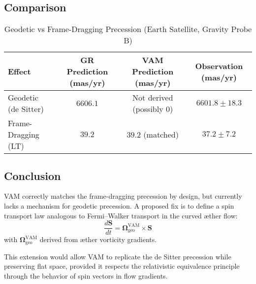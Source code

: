 \subsection*{Comparison}

\begin{table}[h!]
    \centering
    \caption{Geodetic vs Frame-Dragging Precession (Earth Satellite, Gravity Probe B)}
    \label{tab:geodetic}
    \begin{tabular}{lccc}
        \toprule
        Effect & GR Prediction (mas/yr) & VAM Prediction (mas/yr) & Observation (mas/yr) \\
        \midrule
        Geodetic (de Sitter) & $6606.1$ & Not derived (possibly $0$) & $6601.8 \pm 18.3$ \\
        Frame-Dragging (LT)  & $39.2$   & $39.2$ (matched)           & $37.2 \pm 7.2$ \\
        \bottomrule
    \end{tabular}
\end{table}

\subsection*{Conclusion}

VAM correctly matches the frame-dragging precession by design, but currently lacks a mechanism for geodetic precession. A proposed fix is to define a spin transport law analogous to Fermi--Walker transport in the curved æther flow:
\begin{equation}
    \frac{d\mathbf{S}}{dt} = \boldsymbol{\Omega}_\text{geo}^\text{VAM} \times \mathbf{S}
\end{equation}
with $\boldsymbol{\Omega}_\text{geo}^\text{VAM}$ derived from æther vorticity gradients.

This extension would allow VAM to replicate the de Sitter precession while preserving flat space, provided it respects the relativistic equivalence principle through the behavior of spin vectors in flow gradients.